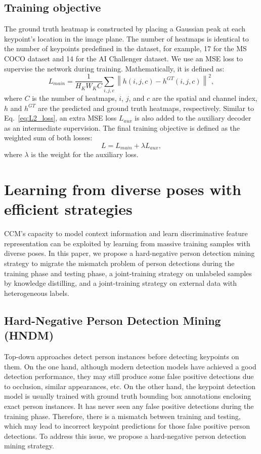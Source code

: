 \documentclass[twocolumn]{svjour3}          \smartqed  \usepackage{natbib}
\begin{document}
\subsection{Training objective}
\label{subsec:objective}
The ground truth heatmap is constructed by placing a Gaussian peak at each keypoint's location in the image plane. The number of heatmaps is identical to the number of keypoints predefined in the dataset, for example, 17 for the MS COCO dataset \citep{lin2014microsoft} and 14 for the AI Challenger dataset. We use an MSE loss to supervise the network during training. Mathematically, it is defined as:
\begin{equation}
L_{main} = \frac{1}{{H_K} {W_K} C}\sum\limits_{i,j,c} {{{\left\| {{h\left(i,j,c\right)} - h^{GT}\left(i,j,c\right)} \right\|}^2}},
\label{eq:L2_loss}
\end{equation}
where $C$ is the number of heatmaps, $i$, $j$, and $c$ are the spatial and channel index, $h$ and $h^{GT}$ are the predicted and ground truth heatmaps, respectively. Similar to Eq.~\eqref{eq:L2_loss}, an extra MSE loss $L_{aux}$ is also added to the auxiliary decoder as an intermediate supervision. The final training objective is defined as the weighted sum of both losses:
\begin{equation}
L = L_{main}  + \lambda {L_{aux}},
\label{eq:final_loss}
\end{equation}
where $\lambda$ is the weight for the auxiliary loss.

\section{Learning from diverse poses with efficient strategies}
\label{sec:learningStrategies}
CCM's capacity to model context information and learn discriminative feature representation can be exploited by learning from massive training samples with diverse poses. In this paper, we propose a hard-negative person detection mining strategy to migrate the mismatch problem of person detections during the training phase and testing phase, a joint-training strategy on unlabeled samples by knowledge distilling, and a joint-training strategy on external data with heterogeneous labels.

\subsection{Hard-Negative Person Detection Mining (HNDM)}
\label{subsec:hndm}
Top-down approaches detect person instances before detecting keypoints on them. On the one hand, although modern detection models have achieved a good detection performance, they may still produce some false positive detections due to occlusion, similar appearances, etc. On the other hand, the keypoint detection model is usually trained with ground truth bounding box annotations enclosing exact person instances. It has never seen any false positive detections during the training phase. Therefore, there is a mismatch between training and testing, which may lead to incorrect keypoint predictions for those false positive person detections. To address this issue, we propose a hard-negative person detection mining strategy.
\end{document}
